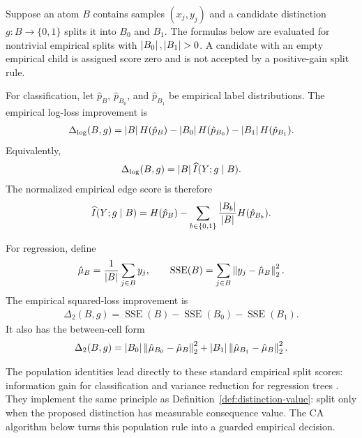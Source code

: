 \begin{definition}
\label{def:empirical-distinction-scores}
Suppose an atom $B$ contains samples $(x_j,y_j)$ and a candidate distinction $g:B\to\{0,1\}$ splits it into $B_0$ and $B_1$. The formulas below are evaluated for nontrivial empirical splits with $\left\lvert B_0\right\rvert,\left\lvert B_1\right\rvert>0$. A candidate with an empty empirical child is assigned score zero and is not accepted by a positive-gain split rule.

For classification, let $\hat p_B$, $\hat p_{B_0}$, and $\hat p_{B_1}$ be empirical label distributions. The empirical log-loss improvement is
\begin{align*}
\Delta_{\log}(B,g)=\left\lvert B\right\rvert H(\hat p_B)-\left\lvert B_0\right\rvert H(\hat p_{B_0})-\left\lvert B_1\right\rvert H(\hat p_{B_1}).
\end{align*}
Equivalently,
\begin{align*}
\Delta_{\log}(B,g)=\left\lvert B\right\rvert\widehat I(Y;g\mid B).
\end{align*}
The normalized empirical edge score is therefore
\begin{align*}
\widehat I(Y;g\mid B)
=
H(\hat p_B)
-
\sum_{b\in\{0,1\}}
\frac{\left\lvert B_b\right\rvert}{\left\lvert B\right\rvert}H(\hat p_{B_b}).
\end{align*}

For regression, define
\begin{align*}
\hat\mu_B=\frac{1}{\left\lvert B\right\rvert}\sum_{j\in B}y_j,\qquad \operatorname{SSE}(B)=\sum_{j\in B}\left\lVert y_j-\hat\mu_B\right\rVert_2^2.
\end{align*}
The empirical squared-loss improvement is
\begin{align*}
\Delta_2(B,g)=\operatorname{SSE}(B)-\operatorname{SSE}(B_0)-\operatorname{SSE}(B_1).
\end{align*}
It also has the between-cell form
\begin{align*}
\Delta_2(B,g)=\left\lvert B_0\right\rvert\left\lVert\hat\mu_{B_0}-\hat\mu_B\right\rVert_2^2+\left\lvert B_1\right\rvert\left\lVert\hat\mu_{B_1}-\hat\mu_B\right\rVert_2^2.
\end{align*}
\end{definition}

The population identities lead directly to these standard empirical split scores: information gain for classification and variance reduction for regression trees \citep{quinlan1986induction,breiman1984classification,domingos2000mining}. They implement the same principle as Definition~\ref{def:distinction-value}: split only when the proposed distinction has measurable consequence value. The CA algorithm below turns this population rule into a guarded empirical decision.

